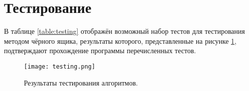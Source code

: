         
    \section{Тестирование}
        В таблице \ref{table:testing} отображён возможный набор тестов
        для тестирования методом чёрного ящика, результаты которого, 
        представленные на рисунке \ref{png:testing:result}, подтверждают
        прохождение программы перечисленных тестов.
        
        \begin{figure}[h!]
            \centering
            \texttt{[image: testing.png]}
            \caption{Результаты тестирования алгоритмов.}
            \label{png:testing:result}
        \end{figure}
\newpage